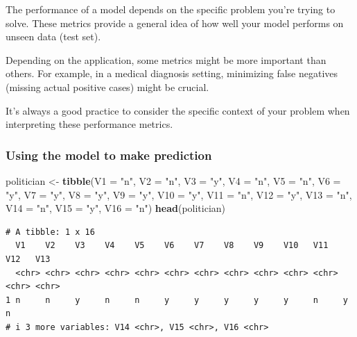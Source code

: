 \documentclass[
]{article}
\newenvironment{Shaded}{\begin{snugshade}}{\end{snugshade}}
\newcommand{\AttributeTok}[1]{\textcolor[rgb]{0.13,0.29,0.53}{#1}}
\newcommand{\FunctionTok}[1]{\textcolor[rgb]{0.13,0.29,0.53}{\textbf{#1}}}
\newcommand{\NormalTok}[1]{#1}
\newcommand{\OtherTok}[1]{\textcolor[rgb]{0.56,0.35,0.01}{#1}}
\newcommand{\StringTok}[1]{\textcolor[rgb]{0.31,0.60,0.02}{#1}}
\begin{document}
The performance of a model depends on the specific problem you're trying
to solve. These metrics provide a general idea of how well your model
performs on unseen data (test set).

Depending on the application, some metrics might be more important than
others. For example, in a medical diagnosis setting, minimizing false
negatives (missing actual positive cases) might be crucial.

It's always a good practice to consider the specific context of your
problem when interpreting these performance metrics.

\subsubsection{Using the model to make
prediction}\label{using-the-model-to-make-prediction}

\begin{Shaded}
\begin{Highlighting}[]
\NormalTok{politician }\OtherTok{\textless{}{-}} \FunctionTok{tibble}\NormalTok{(}\AttributeTok{V1 =} \StringTok{"n"}\NormalTok{, }\AttributeTok{V2 =} \StringTok{"n"}\NormalTok{, }\AttributeTok{V3 =} \StringTok{"y"}\NormalTok{, }\AttributeTok{V4 =} \StringTok{"n"}\NormalTok{, }\AttributeTok{V5 =} \StringTok{"n"}\NormalTok{,}
                     \AttributeTok{V6 =} \StringTok{"y"}\NormalTok{, }\AttributeTok{V7 =} \StringTok{"y"}\NormalTok{, }\AttributeTok{V8 =} \StringTok{"y"}\NormalTok{, }\AttributeTok{V9 =} \StringTok{"y"}\NormalTok{, }\AttributeTok{V10 =} \StringTok{"y"}\NormalTok{,}
                     \AttributeTok{V11 =} \StringTok{"n"}\NormalTok{, }\AttributeTok{V12 =} \StringTok{"y"}\NormalTok{, }\AttributeTok{V13 =} \StringTok{"n"}\NormalTok{, }\AttributeTok{V14 =} \StringTok{"n"}\NormalTok{,}
                     \AttributeTok{V15 =} \StringTok{"y"}\NormalTok{, }\AttributeTok{V16 =} \StringTok{"n"}\NormalTok{)}
\FunctionTok{head}\NormalTok{(politician)}
\end{Highlighting}
\end{Shaded}

\begin{verbatim}
# A tibble: 1 x 16
  V1    V2    V3    V4    V5    V6    V7    V8    V9    V10   V11   V12   V13  
  <chr> <chr> <chr> <chr> <chr> <chr> <chr> <chr> <chr> <chr> <chr> <chr> <chr>
1 n     n     y     n     n     y     y     y     y     y     n     y     n    
# i 3 more variables: V14 <chr>, V15 <chr>, V16 <chr>
\end{verbatim}
\end{document}
